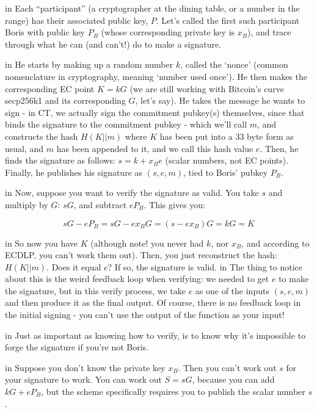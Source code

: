 \documentclass[10pt,a4paper]{article}
\begin{document}
 in \noindent Each ``participant'' (a cryptographer at the dining table, or a number in the range) has their associated public key, $P$. Let's called the first such participant Boris with public key $P_B$ (whose corresponding private key is $x_B$), and trace through what he can (and can't!) do to make a signature.

 in \noindent He starts by making up a random number $k$, called the `nonce' (common nomenclature in cryptography, meaning `number used once'). He then makes the corresponding EC point $K = kG$ (we are still working with Bitcoin's curve secp256k1 and its corresponding $G$, let's say). He takes the message he wants to sign - in CT, we actually sign the commitment pubkey(s) themselves, since that binds the signature to the commitment pubkey - which we'll call $m$, and constructs the hash $H(K||m)$ where $K$ has been put into a 33 byte form as usual, and $m$ has been appended to it, and we call this hash value $e$. Then, he finds the signature as follows: $s = k + x_{B}e$ (scalar numbers, not EC points). Finally, he publishes his signature as $(s,e,m)$, tied to Boris' pubkey $P_B$.

 in \noindent Now, suppose you want to verify the signature as valid. You take $s$ and multiply by $G$: $sG$, and subtract $eP_B$. This gives you:

\[sG - eP_B = sG - ex_{B}G = (s - ex_{B})G = kG = K \]

 in \noindent So now you have $K$ (although note! you never had $k$, nor $x_B$, and according to ECDLP, you can't work them out).
Then, you just reconstruct the hash: $H(K || m)$. Does it equal $e$? If so, the signature is valid.
 in \noindent The thing to notice about this is the weird feedback loop when verifying: we needed to get $e$ to make the signature, but in this verify process, we take $e$ as one of the inputs $(s,e,m)$ and then produce it as the final output. Of course, there is no feedback loop in the initial signing - you can't use the output of the function as your input!

 in \noindent Just as important as knowing how to verify, is to know why it's impossible to forge the signature if you're not Boris.

 in \noindent Suppose you don't know the private key $x_B$. Then you can't work out $s$ for your signature to work. You can work out $S = sG$, because you can add $kG + eP_B$, but the scheme specifically requires you to publish the scalar number $s$.
\end{document}
